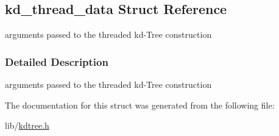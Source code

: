 \hypertarget{structkd__thread__data}{
\subsection{kd\_\-thread\_\-data Struct Reference}
\label{structkd__thread__data}
}
arguments passed to the threaded kd-Tree construction  




\subsubsection{Detailed Description}
arguments passed to the threaded kd-Tree construction 

The documentation for this struct was generated from the following file:\begin{CompactItemize}
\item 
lib/\hyperlink{kdtree_8h}{kdtree.h}\end{CompactItemize}
